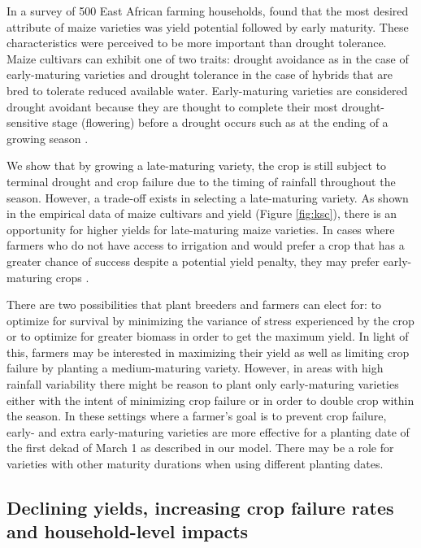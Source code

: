 In a survey of 500 East African farming households,  found that the most desired attribute of maize varieties was yield potential followed by early maturity. These characteristics were perceived to be more important than drought tolerance. Maize cultivars can exhibit one of two traits: drought avoidance as in the case of early-maturing varieties and drought tolerance in the case of hybrids that are bred to tolerate reduced available water. Early-maturing varieties are considered drought avoidant because they are thought to complete their most drought-sensitive stage (flowering) before a drought occurs such as at the ending of a growing season \cite{barron2003dry, morris2001assessing}.

We show that by growing a late-maturing variety, the crop is still subject to terminal drought and crop failure due to the timing of rainfall throughout the season. However, a trade-off exists in selecting a late-maturing variety. As shown in the empirical data of maize cultivars and yield (Figure \ref{fig:ksc}), there is an opportunity for higher yields for late-maturing maize varieties. In cases where farmers who do not have access to irrigation and would prefer a crop that has a greater chance of success despite a potential yield penalty, they may prefer early-maturing crops \cite{barron2003dry}.

There are two possibilities that plant breeders and farmers can elect for: to optimize for survival by minimizing the variance of stress experienced by the crop or to optimize for greater biomass in order to get the maximum yield. In light of this, farmers may be interested in maximizing their yield as well as limiting crop failure by planting a medium-maturing variety. However, in areas with high rainfall variability there might be reason to plant only early-maturing varieties either with the intent of minimizing crop failure or in order to double crop within the season. In these settings where a farmer’s goal is to prevent crop failure, early- and extra early-maturing varieties are more effective for a planting date of the first dekad of March 1 as described in our model.  There may be a role for varieties with other maturity durations when using different planting dates. 

\subsection{Declining yields, increasing crop failure rates and household-level impacts}

